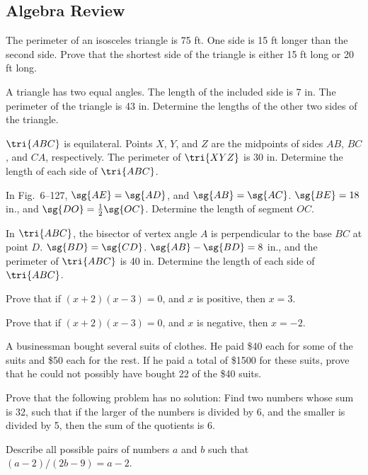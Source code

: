 \documentclass[11pt]{book}
\theoremstyle{bkplain}
\theoremstyle{XIplainnote}
\theoremstyle{bkplain}
\theoremstyle{bkplain}
\begin{document}
\subsection*{Algebra Review}
\begin{exlist}
\item The perimeter of an isosceles triangle is 75 ft. One side is 15 ft longer
  than the second side. Prove that the shortest side of the triangle is either
  15 ft long or 20 ft long.
\item A triangle has two equal angles. The length of the included side is 7 in.
  The perimeter of the triangle is 43 in. Determine the lengths of the other
  two sides of the triangle.
\item $\tri{ABC}$ is equilateral. Points $X$, $Y$, and $Z$ are the midpoints of
  sides $AB$, $BC$, and $CA$, respectively. The perimeter of $\tri{XYZ}$ is
  30 in. Determine the length of each side of $\tri{ABC}$.
\item In Fig.~6--127, $\sg{AE} = \sg{AD}$, and $\sg{AB} = \sg{AC}$. $\sg{BE} =
  18$ in., and $\sg{DO} = \tfrac{1}{2}\sg{OC}$. Determine the length of segment
  $OC$.
\exfig{\FIGVIONEHUNDREDTWENTYSEVEN}
\item In $\tri{ABC}$, the bisector of vertex angle $A$ is perpendicular to the
  base $BC$ at point $D$. $\sg{BD} = \sg{CD}$. $\sg{AB} - \sg{BD} = 8$ in., and
  the perimeter of $\tri{ABC}$ is 40 in. Determine the length of each side of
  $\tri{ABC}$.
\item Prove that if $(x + 2)(x - 3) = 0$, and $x$ is positive, then $x = 3$.
\item Prove that if $(x + 2)(x - 3) = 0$, and $x$ is negative, then $x = -2$.
\item A businessman bought several suits of clothes. He paid \$40 each for some
  of the suits and \$50 each for the rest. If he paid a total of \$1500 for
  these suits, prove that he could not possibly have bought 22 of the \$40
  suits.
\item[\stex 9.] Prove that the following problem has no solution: Find two
  numbers whose sum is 32, such that if the larger of the numbers is divided by
  6, and the smaller is divided by 5, then the sum of the quotients is 6.
\item[\stex 10.] Describe all possible pairs of numbers $a$ and $b$ such that
  $(a - 2)/(2b - 9) = a - 2$.
\end{exlist}
\clearpage
\setcounter{theorem}{0}\setcounter{definition}{0}\setcounter{construction}{0}\setcounter{exgroup}{0}\setcounter{footnote}{0}
\setcounter{chapter}{7}
\end{document}
